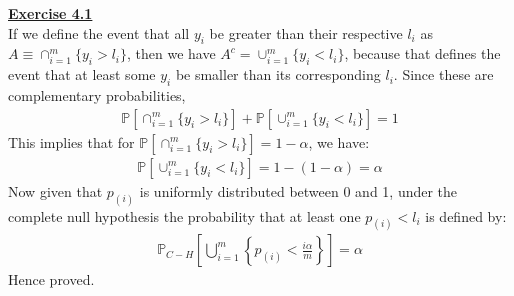 \documentclass[a4paper, 11pt]{article}
\begin{document}
\newline \textbf{\underline{Exercise 4.1}}\\
\newline If we define the event that all $y_i$ be greater than their respective $l_i$ as $A \equiv \cap_{i=1}^{m} \{y_i > l_i \}$, then we have $A^{c} = \cup_{i=1}^{m} \{y_i < l_i \}$, because that defines the event that at least some $y_i$ be smaller than its corresponding $l_i$. Since these are complementary probabilities,
\begin{eqnarray}
\mathbb{P} [ \cap_{i=1}^{m} \{y_i > l_i \} ] + \mathbb{P} [ \cup_{i=1}^{m} \{y_i < l_i \} ]  = 1\nonumber
\end{eqnarray}
This implies that for $\mathbb{P} [ \cap_{i=1}^{m} \{y_i > l_i \} ] = 1-\alpha$, we have:
\begin{eqnarray}
\mathbb{P} [ \cup_{i=1}^{m} \{y_i < l_i \} ] = 1 - (1-\alpha) = \alpha \nonumber
\end{eqnarray}
Now given that $p_{(i)}$ is uniformly distributed between 0 and 1, under the complete null hypothesis the probability that at least one $p_{(i)} < l_i$ is defined by:
\begin{eqnarray}
\mathbb{P}_{C-H} \left[ \bigcup_{i=1}^{m} \left\{p_{(i)} < \frac{i \alpha}{m} \right\} \right] = \alpha \nonumber
\end{eqnarray}
Hence proved.
\end{document}
